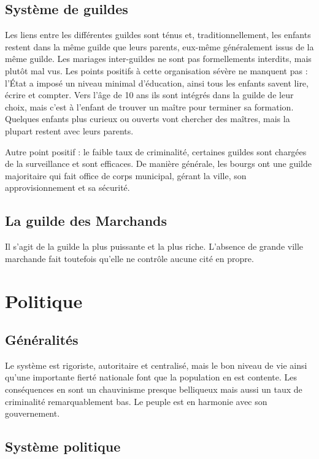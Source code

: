 \documentclass[french, a4paper, 12pt]{article}
\begin{document}
\subsection{Système de guildes}

Les liens entre les différentes guildes sont ténus et, traditionnellement, les enfants restent dans la même guilde que leurs parents, eux-même généralement issus de la même guilde. Les mariages inter-guildes ne sont pas formellements interdits, mais plutôt mal vus. Les points positifs à cette organisation sévère ne manquent pas : l'État a imposé un niveau minimal d'éducation, ainsi tous les enfants savent lire, écrire et compter. Vers l'âge de 10 ans ils sont intégrés dans la guilde de leur choix, mais c'est à l'enfant de trouver un maître pour terminer sa formation. Quelques enfants plus curieux ou ouverts vont chercher des maîtres, mais la plupart restent avec leurs parents.

Autre point positif : le faible taux de criminalité, certaines guildes sont chargées de la surveillance et sont efficaces. De manière générale, les bourgs ont une guilde majoritaire qui fait office de corps municipal, gérant la ville, son approvisionnement et sa sécurité.

\subsection{La guilde des Marchands}

Il s'agit de la guilde la plus puissante et la plus riche. L'absence de grande ville marchande fait toutefois qu'elle ne contrôle aucune cité en propre.

\section{Politique}

\subsection{Généralités}

Le système est rigoriste, autoritaire et centralisé, mais le bon niveau de vie ainsi qu'une importante fierté nationale font que la population en est contente. Les conséquences en sont un chauvinisme presque belliqueux mais aussi un taux de criminalité remarquablement bas. Le peuple est en harmonie avec son gouvernement.

\subsection{Système politique}
\end{document}
